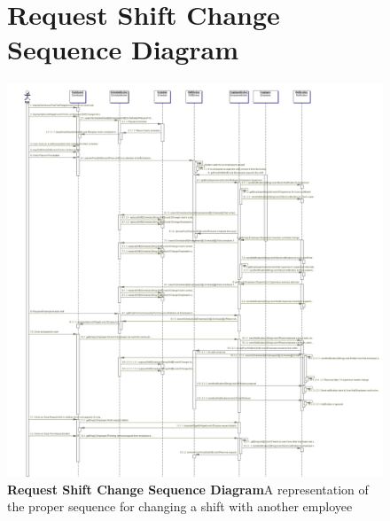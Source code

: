 \documentclass[letterpaper,12pt]{report}
\begin{document}
\begin{figure}[hbp]
 \section{Request Shift Change Sequence Diagram}
 \includegraphics[scale=0.28]{diagrams/seqRequestShiftChange.png}
 \caption{\small
\textbf{Request Shift Change Sequence Diagram}\newline A representation of the proper sequence for changing a shift with another employee}\label{fig:seqRequestShiftChange}
\end{figure}
\newpage
\end{document}
